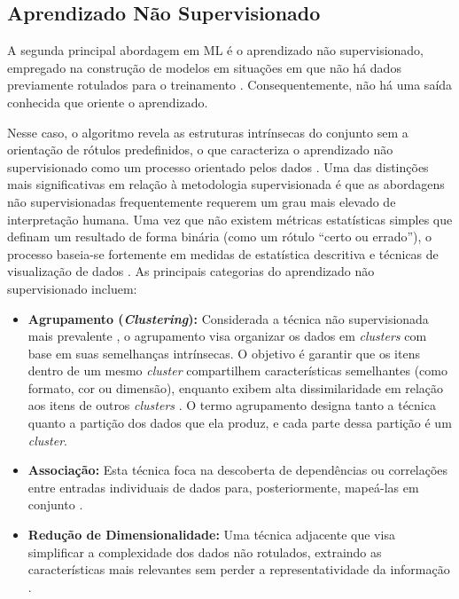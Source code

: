 \documentclass{uflamon}          %
\begin{document}
\subsection{Aprendizado Não Supervisionado}

A segunda principal abordagem em ML é o aprendizado não supervisionado, empregado na construção de modelos em situações em que não há dados previamente rotulados para o treinamento \cite{solorio2020}. Consequentemente, não há uma saída conhecida que oriente o aprendizado.

Nesse caso, o algoritmo revela as estruturas intrínsecas do conjunto sem a orientação de rótulos predefinidos, o que caracteriza o aprendizado não supervisionado como um processo orientado pelos dados \cite{rezazadeh2025}. Uma das distinções mais significativas em relação à metodologia supervisionada é que as abordagens não supervisionadas frequentemente requerem um grau mais elevado de interpretação humana. Uma vez que não existem métricas estatísticas simples que definam um resultado de forma binária (como um rótulo ``certo ou errado''), o processo baseia-se fortemente em medidas de estatística descritiva e técnicas de visualização de dados \cite{gopal2018}. As principais categorias do aprendizado não supervisionado incluem:

\begin{itemize}
    \item \textbf{Agrupamento (\textit{Clustering}):} Considerada a técnica não supervisionada mais prevalente \cite{kononenko2007}, o agrupamento visa organizar os dados em \textit{clusters} com base em suas semelhanças intrínsecas. O objetivo é garantir que os itens dentro de um mesmo \textit{cluster} compartilhem características semelhantes (como formato, cor ou dimensão), enquanto exibem alta dissimilaridade em relação aos itens de outros \textit{clusters} \cite{iglesias2021, shalev2014}. O termo agrupamento designa tanto a técnica quanto a partição dos dados que ela produz, e cada parte dessa partição é um \textit{cluster}.
    \item \textbf{Associação:} Esta técnica foca na descoberta de dependências ou correlações entre entradas individuais de dados para, posteriormente, mapeá-las em conjunto \cite{dike2018}.
    \item \textbf{Redução de Dimensionalidade:} Uma técnica adjacente que visa simplificar a complexidade dos dados não rotulados, extraindo as características mais relevantes sem perder a representatividade da informação \cite{gopal2018}.
\end{itemize}
\end{document}
